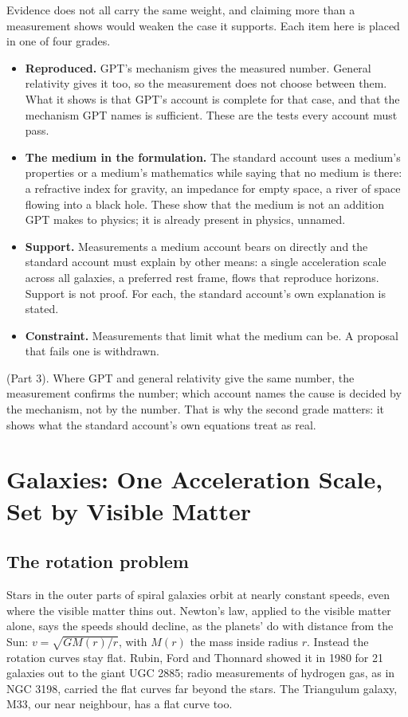 \documentclass[11pt,a4paper]{article}
\begin{document}
Evidence does not all carry the same weight, and claiming more than a measurement shows would weaken the case it supports. Each item here is placed in one of four grades.
\begin{itemize}
\item \textbf{Reproduced.} GPT's mechanism gives the measured number. General relativity gives it too, so the measurement does not choose between them. What it shows is that GPT's account is complete for that case, and that the mechanism GPT names is sufficient. These are the tests every account must pass.
\item \textbf{The medium in the formulation.} The standard account uses a medium's properties or a medium's mathematics while saying that no medium is there: a refractive index for gravity, an impedance for empty space, a river of space flowing into a black hole. These show that the medium is not an addition GPT makes to physics; it is already present in physics, unnamed.
\item \textbf{Support.} Measurements a medium account bears on directly and the standard account must explain by other means: a single acceleration scale across all galaxies, a preferred rest frame, flows that reproduce horizons. Support is not proof. For each, the standard account's own explanation is stated.
\item \textbf{Constraint.} Measurements that limit what the medium can be. A proposal that fails one is withdrawn.
\end{itemize}

 (Part 3). Where GPT and general relativity give the same number, the measurement confirms the number; which account names the cause is decided by the mechanism, not by the number. That is why the second grade matters: it shows what the standard account's own equations treat as real.

\section{Galaxies: One Acceleration Scale, Set by Visible Matter}

\subsection{The rotation problem}

Stars in the outer parts of spiral galaxies orbit at nearly constant speeds, even where the visible matter thins out. Newton's law, applied to the visible matter alone, says the speeds should decline, as the planets' do with distance from the Sun: $v = \sqrt{GM(r)/r}$, with $M(r)$ the mass inside radius $r$. Instead the rotation curves stay flat. Rubin, Ford and Thonnard showed it in 1980 for 21 galaxies out to the giant UGC 2885; radio measurements of hydrogen gas, as in NGC 3198, carried the flat curves far beyond the stars. The Triangulum galaxy, M33, our near neighbour, has a flat curve too.
\end{document}
